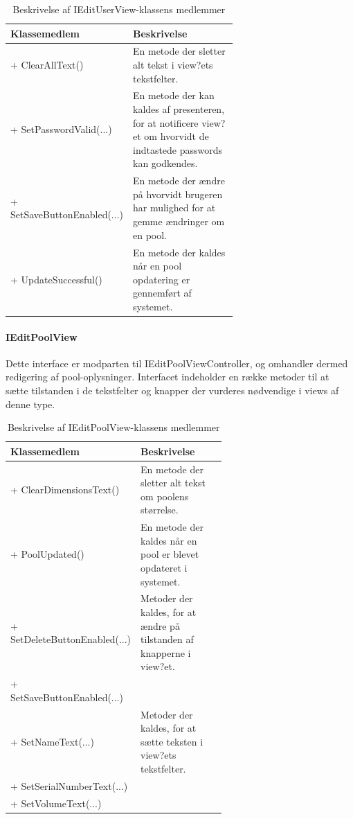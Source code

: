 \begin{table}
	\centering
	\begin{tabular}{| l | p{0.65\linewidth} |}
		\toprule
		\textbf{Klassemedlem}	& \textbf{Beskrivelse} \\
		\midrule
		+ ClearAllText()				& En metode der sletter alt tekst i view?ets tekstfelter. \\\hline
		+ SetPasswordValid(...)					& En metode der kan kaldes af presenteren, for at notificere view?et om hvorvidt de indtastede passwords kan godkendes.  \\\hline
		+ SetSaveButtonEnabled(...)				& En metode der ændre på hvorvidt brugeren har mulighed for at gemme ændringer om en pool.  \\\hline
		+ UpdateSuccessful()				& En metode der kaldes når en pool opdatering er gennemført af systemet. \\
		\bottomrule
		\end{tabular}
	\caption{Beskrivelse af IEditUserView-klassens medlemmer}
	\label{tab:table_design_iedituserview}	
\end{table}

\paragraph{IEditPoolView}
Dette interface er modparten til IEditPoolViewController, og omhandler dermed redigering af pool-oplysninger. Interfacet indeholder en række metoder til at sætte tilstanden i de tekstfelter og knapper der vurderes nødvendige i views af denne type.

\begin{table}
	\centering
	\begin{tabular}{| l | p{0.62\linewidth} |}
		\toprule
		\textbf{Klassemedlem}	& \textbf{Beskrivelse} \\
		\midrule
		+ ClearDimensionsText()				 &En metode der sletter alt tekst om poolens størrelse. \\\hline
		+ PoolUpdated()					& En metode der kaldes når en pool er blevet opdateret i systemet. \\\hline
		+ SetDeleteButtonEnabled(...)				& Metoder der kaldes, for at ændre på tilstanden af knapperne i view?et. \\
		+ SetSaveButtonEnabled(...)				& \\\hline
		+ SetNameText(...)						& Metoder der kaldes, for at sætte teksten i view?ets tekstfelter.
 \\
		+ SetSerialNumberText(...)				& \\
		+ SetVolumeText(...)						& \\
		\bottomrule
		\end{tabular}
	\caption{Beskrivelse af IEditPoolView-klassens medlemmer}
	\label{tab:table_design_ieditPoolview}	
\end{table}


